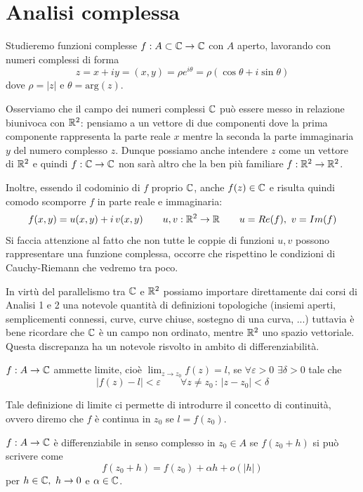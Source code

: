 
\chapter{Analisi complessa}

Studieremo funzioni complesse $f : A\subset\mathbb{C}\rightarrow \mathbb{C}$ con $A$ aperto, lavorando con numeri complessi di forma
\begin{equation*}
z = x + iy = (x, y) = \rho e^{i\theta} = \rho (\cos\theta + i\sin\theta)
\end{equation*}
dove $\rho=|z|$ e $\theta=\text{arg}(z)$.

Osserviamo che il campo dei numeri complessi $\mathbb{C}$ può essere messo in relazione
biunivoca con $\mathbb{R}^2$: pensiamo a un vettore di due componenti dove la prima componente rappresenta la parte
reale $x$ mentre la seconda la parte immaginaria $y$ del numero complesso $z$. Dunque possiamo anche intendere $z$ come un vettore di $\mathbb{R}^2$ e quindi $f:\mathbb{C}\to\mathbb{C}$ non sarà altro che la ben più familiare $f:\mathbb{R}^2\to\mathbb{R}^2$.

Inoltre, essendo il codominio di $f$ proprio $\mathbb{C}$, anche $f(z)\in\mathbb{C}$ e risulta quindi comodo scomporre $f$ in parte reale e immaginaria:
$$
f(x,y)=u(x,y)+i\,v(x,y)\qquad u,v:\mathbb{R}^2\to\mathbb{R} \qquad u=Re(f),\ v=Im(f)
$$
Si faccia attenzione al fatto che non tutte le coppie di funzioni $u,v$ possono rappresentare una funzione
complessa, occorre che rispettino le condizioni di Cauchy-Riemann che vedremo tra poco.

In virtù del parallelismo tra $\mathbb{C}$ e $\mathbb{R}^2$ possiamo importare direttamente dai corsi di Analisi 1 e 2 una notevole quantità di definizioni topologiche (insiemi aperti, semplicementi connessi, curve, curve chiuse, sostegno di una curva, ...) tuttavia è bene ricordare che $\mathbb{C}$ è un campo non ordinato, mentre $\mathbb{R}^2$ uno spazio vettoriale. Questa discrepanza ha un notevole risvolto in ambito di differenziabilità.

\begin{defn}
$f:A\to\mathbb{C}$ ammette limite, cioè $\lim_{z\to z_0}f(z)=l$, se $\forall \varepsilon>0$ $\exists\delta>0$ tale che 
$$|f(z)-l|<\varepsilon \qquad \forall z\neq z_0\,:\,|z-z_0|<\delta$$ 
\end{defn}

Tale definizione di limite ci permette di introdurre il concetto di continuità, ovvero diremo che $f$ è continua in $z_0$ se $l=f(z_0)$.

\begin{defn}
$f:A\to\mathbb{C}$ è differenziabile in senso complesso in $z_0\in A$ se $f(z_0 + h)$ si può scrivere come
\begin{equation*}
f(z_0 + h) = f(z_0) + \alpha h + o(|h|)
\end{equation*}
per $h\in\mathbb{C},\ h\rightarrow 0$ e $\alpha\in\mathbb{C}$.
\end{defn}

